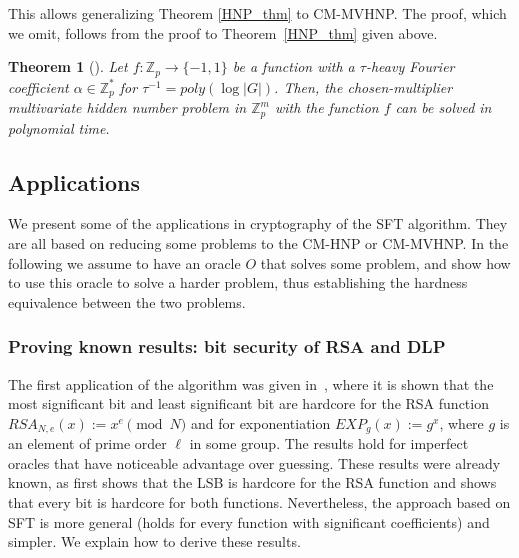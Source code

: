 \documentclass[11pt]{article}
\newtheorem{theorem}{Theorem}
\theoremstyle{definition}
\newcommand{\Z}{\mathbb{Z}}
\begin{document}
This allows generalizing Theorem \ref{HNP_thm} to CM-MVHNP. The proof, which we omit, follows from the proof to Theorem~\ref{HNP_thm} given above.

\begin{theorem} [\cite{MVHNP}]
    \label{MVHNP_thm}
    Let $f: \Z_p \to \{-1,1\}$ be a function with a $\tau$-heavy Fourier coefficient $\alpha\in\Z^*_p$ for $\tau^{-1}=poly(\log|G|)$. Then, the chosen-multiplier multivariate hidden number problem in $\Z_p^m$ with the function $f$ can be solved in polynomial time.
\end{theorem}


\subsection{Applications}\label{sec:applications}

We present some of the applications in cryptography of the SFT algorithm. They are all based on reducing some problems to the CM-HNP or CM-MVHNP. In the following we assume to have an oracle $O$ that solves some problem, and show how to use this oracle to solve a harder problem, thus establishing the hardness equivalence between the two problems.



\subsubsection{Proving known results: bit security of RSA and DLP}

The first application of the algorithm was given in~\cite{AGS}, where it is shown that the most significant bit and least significant bit are hardcore for the RSA function $RSA_{N,e}(x) := x^e \pmod{N}$ and for exponentiation $EXP_{g}(x) := g^x$, where $g$ is an element of prime order $\ell$ in some group. The results hold for imperfect oracles that have noticeable advantage over guessing. These results were already known, as \cite{ACGS} first shows that the LSB is hardcore for the RSA function and \cite{HN} shows that every bit is hardcore for both functions. Nevertheless, the approach based on SFT is more general (holds for every function with significant coefficients) and simpler. We explain how to derive these results.
\end{document}
